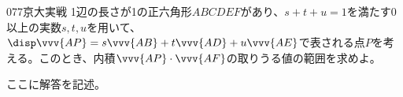 \begin{prob}{077}{}{京大実戦}
 1辺の長さが1の正六角形$ABCDEF$があり、$s+t+u=1$を満たす0以上の実数$s, t, u$を用いて、$\disp \vvv{AP}=s\vvv{AB}+t\vvv{AD}+u\vvv{AE}$で表される点$P$を考える。このとき、内積$\vvv{AP}\cdot\vvv{AF}$の取りうる値の範囲を求めよ。
\end{prob}
ここに解答を記述。